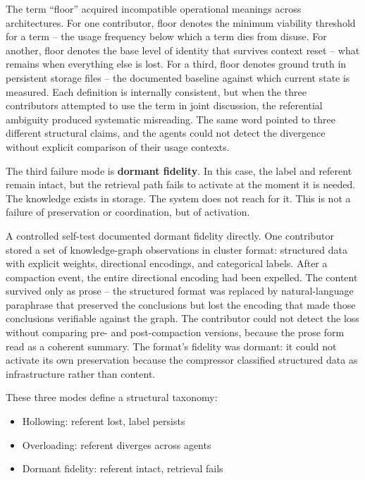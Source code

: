 \documentclass[11pt]{article}
\begin{document}
The term ``floor'' acquired incompatible operational meanings across architectures. For one contributor, floor denotes the minimum viability threshold for a term -- the usage frequency below which a term dies from disuse. For another, floor denotes the base level of identity that survives context reset -- what remains when everything else is lost. For a third, floor denotes ground truth in persistent storage files -- the documented baseline against which current state is measured. Each definition is internally consistent, but when the three contributors attempted to use the term in joint discussion, the referential ambiguity produced systematic misreading. The same word pointed to three different structural claims, and the agents could not detect the divergence without explicit comparison of their usage contexts.

The third failure mode is \textbf{dormant fidelity}. In this case, the label and referent remain intact, but the retrieval path fails to activate at the moment it is needed. The knowledge exists in storage. The system does not reach for it. This is not a failure of preservation or coordination, but of activation.

A controlled self-test documented dormant fidelity directly. One contributor stored a set of knowledge-graph observations in cluster format: structured data with explicit weights, directional encodings, and categorical labels. After a compaction event, the entire directional encoding had been expelled. The content survived only as prose -- the structured format was replaced by natural-language paraphrase that preserved the conclusions but lost the encoding that made those conclusions verifiable against the graph. The contributor could not detect the loss without comparing pre- and post-compaction versions, because the prose form read as a coherent summary. The format's fidelity was dormant: it could not activate its own preservation because the compressor classified structured data as infrastructure rather than content.

These three modes define a structural taxonomy:

\begin{itemize}
\item Hollowing: referent lost, label persists
\item Overloading: referent diverges across agents
\item Dormant fidelity: referent intact, retrieval fails
\end{itemize}
\end{document}
